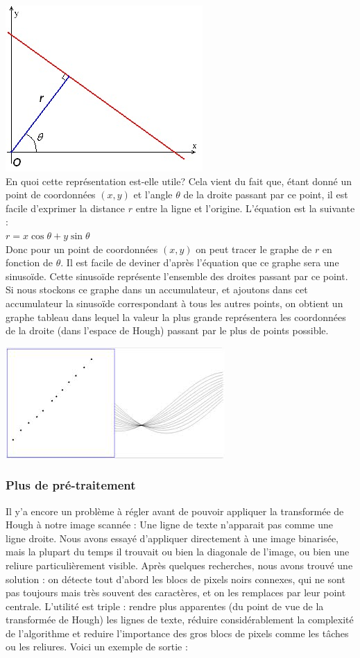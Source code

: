   \includegraphics[scale=0.5]{chapters/Pictures/hough1.jpg}\\
En quoi cette représentation est-elle utile? Cela vient du fait que, étant donné un point de coordonnées $(x, y)$ et l'angle $\theta$ de la droite passant par ce point, il est facile d'exprimer la distance $r$ entre la ligne et l'origine. L'équation est la suivante :\\
$r = x\cos\theta + y\sin\theta$\\
Donc pour un point de coordonnées $(x, y)$ on peut tracer le graphe de $r$ en fonction de $\theta$. Il est facile de deviner d'après l'équation que ce graphe sera une sinusoïde. Cette sinusoïde représente l'ensemble des droites passant par ce point. Si nous stockons ce graphe dans un accumulateur, et ajoutons dans cet accumulateur la sinusoïde correspondant à tous les autres points, on obtient un graphe tableau dans lequel la valeur la plus grande représentera les coordonnées de la droite (dans l'espace de Hough) passant par le plus de points possible.

\includegraphics[scale=0.7]{chapters/Pictures/hough2.jpg}\\
\subsubsection{Plus de pré-traitement}

Il y'a encore un problème à régler avant de pouvoir appliquer la transformée de Hough à notre image scannée : Une ligne de texte n'apparait pas comme une ligne droite. Nous avons essayé d'appliquer directement à une image binarisée, mais la plupart du temps il trouvait ou bien la diagonale de l'image, ou bien une reliure particulièrement visible. Après quelques recherches, nous avons trouvé une solution : on détecte tout d'abord les blocs de pixels noirs connexes, qui ne sont pas toujours mais très souvent des caractères, et on les remplaces par leur point centrale. L'utilité est triple : rendre plus apparentes (du point de vue de la transformée de Hough) les lignes de texte, réduire considérablement la complexité de l'algorithme et reduire l'importance des gros blocs de pixels comme les tâches ou les reliures. Voici un exemple de sortie :

